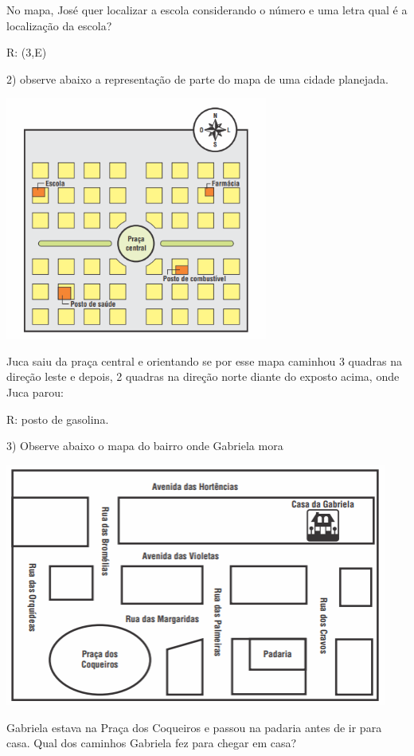 No mapa, José quer localizar a escola considerando o número e uma letra
qual é a localização da escola?

R: (3,E)

2) observe abaixo a representação de parte do mapa de uma cidade
planejada.

\includegraphics[width=3.39535in,height=3.14326in]{./imgSAEB_6_MAT/media/image65.png}

Juca saiu da praça central e orientando se por esse mapa caminhou 3
quadras na direção leste e depois, 2 quadras na direção norte diante do
exposto acima, onde Juca parou:

R: posto de gasolina.

3) Observe abaixo o mapa do bairro onde Gabriela mora

\includegraphics[width=4.95347in,height=3.13958in]{./imgSAEB_6_MAT/media/image66.png}

Gabriela estava na Praça dos Coqueiros e passou na padaria antes de ir
para casa. Qual dos caminhos Gabriela fez para chegar em casa?

